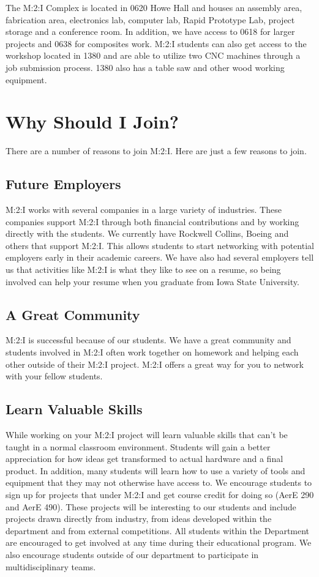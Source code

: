 \documentclass[10pt,foldmark,notumble]{leaflet}
\begin{document}
The M:2:I Complex is located in 0620 Howe Hall and houses an assembly area, fabrication area, electronics lab, computer lab, Rapid Prototype Lab, project storage and a conference room.  In addition, we have access to 0618 for larger projects and 0638 for composites work.  M:2:I students can also get access to the workshop located in 1380 and are able to utilize  two CNC machines through a job submission process.  1380 also has a table saw and other wood working equipment.

\section{Why Should I Join?}

There are a number of reasons to join M:2:I.  Here are just a few reasons to join.

\subsection{Future Employers}
M:2:I works with several companies in a large variety of industries.  These companies support M:2:I through both financial contributions and by working directly with the students.  We currently have Rockwell Collins, Boeing and others that support M:2:I.  This allows students to start networking with potential employers early in their academic careers.  We have also had several employers tell us that activities like M:2:I is what they like to see on a resume, so being involved can help your resume when you graduate from Iowa State University.

\subsection{A Great Community}
M:2:I is successful because of our students.  We have a great community and students involved in M:2:I often work together on homework and helping each other outside of their M:2:I project.  M:2:I offers a great way for you to network with your fellow students.

\subsection{Learn Valuable Skills}
While working on your M:2:I project will learn valuable skills that can't be taught in a normal classroom environment.  Students will gain a better appreciation for how ideas get transformed to actual hardware and a final product.  In addition, many students will learn how to use a variety of tools and equipment that they may not otherwise have access to.  We encourage students to sign up for projects that under M:2:I and get course credit for doing so (AerE 290 and AerE 490).  These projects will be interesting to our students and include projects drawn directly from industry, from ideas developed within the department and from external competitions.  All students within the Department are encouraged to get involved at any time during their educational program.  We also encourage students outside of our department to participate in multidisciplinary teams.
\end{document}
